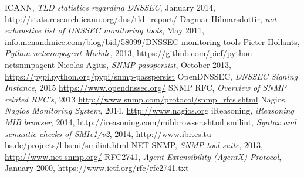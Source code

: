 \begin{thebibliography}{1}
\label{chap:references}
 ICANN, {\em TLD statistics regarding DNSSEC}, January 2014, \url{http://stats.research.icann.org/dns/tld_report/}
 Dagmar Hilmarsdottir, {\em not exhaustive list of DNSSEC monitoring tools}, May 2011, \url{info.menandmice.com/blog/bid/58099/DNSSEC-monitoring-tools}
 Pieter Hollants, {\em Python-netsnmpagent Module}, 2013, \url{https://github.com/pief/python-netsnmpagent}
 Nicolas Agius, {\em SNMP passpersist}, October 2013, \url{https://pypi.python.org/pypi/snmp-passpersist}
 OpenDNSSEC, {\em DNSSEC Signing Instance}, 2015 \url{https://www.opendnssec.org/}
 SNMP RFC, {\em Overview of SNMP related RFC's}, 2013 \url{http://www.snmp.com/protocol/snmp_rfcs.shtml} 
 Nagios, {\em Nagios Monitoring System}, 2014, \url{http://www.nagios.org}
 iReasoning, {\em iReasoning MIB browser}, 2014, \url{http://ireasoning.com/mibbrowser.shtml}
 smilint,  {\em Syntax and semantic checks of SMIv1/v2}, 2014, \url{http://www.ibr.cs.tu-bs.de/projects/libsmi/smilint.html}
 NET-SNMP,  {\em SNMP tool suite}, 2013, \url{http://www.net-snmp.org/}
 RFC2741,  {\em Agent Extensibility (AgentX) Protocol}, January 2000, \url{https://www.ietf.org/rfc/rfc2741.txt}
\end{thebibliography}
